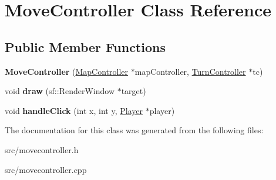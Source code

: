 \hypertarget{class_move_controller}{}\section{Move\+Controller Class Reference}
\label{class_move_controller}
\subsection*{Public Member Functions}
\begin{DoxyCompactItemize}
\item 
\hypertarget{class_move_controller_adf3b8449aa76810b59d7fc79b99c6317}{}{\bfseries Move\+Controller} (\hyperlink{class_map_controller}{Map\+Controller} $\ast$map\+Controller, \hyperlink{class_turn_controller}{Turn\+Controller} $\ast$tc)\label{class_move_controller_adf3b8449aa76810b59d7fc79b99c6317}

\item 
\hypertarget{class_move_controller_a409253aac50aa25591f7189f7ba370f0}{}void {\bfseries draw} (sf\+::\+Render\+Window $\ast$target)\label{class_move_controller_a409253aac50aa25591f7189f7ba370f0}

\item 
\hypertarget{class_move_controller_a6de846ed248aa533a8e5c57a40dee442}{}void {\bfseries handle\+Click} (int x, int y, \hyperlink{class_player}{Player} $\ast$player)\label{class_move_controller_a6de846ed248aa533a8e5c57a40dee442}

\end{DoxyCompactItemize}


The documentation for this class was generated from the following files\+:\begin{DoxyCompactItemize}
\item 
src/movecontroller.\+h\item 
src/movecontroller.\+cpp\end{DoxyCompactItemize}
